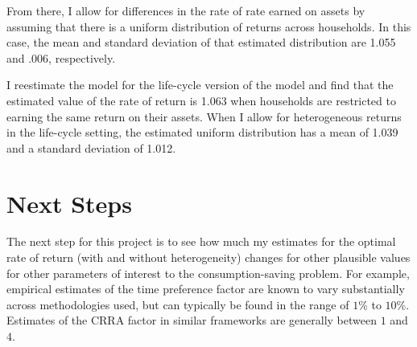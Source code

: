 \documentclass[\econtexRoot/Chp1proposal]{subfiles}
\begin{document}
\par From there, I allow for differences in the rate of rate earned on assets by assuming that there is a uniform distribution of returns across households. In this case, the mean and standard deviation of that estimated distribution are 1.055 and .006, respectively.

\par I reestimate the model for the life-cycle version of the model and find that the estimated value of the rate of return is 1.063 when households are restricted to earning the same return on their assets. When I allow for heterogeneous returns in the life-cycle setting, the estimated uniform distribution has a mean of 1.039 and a standard deviation of 1.012.

\section{Next Steps}

\par The next step for this project is to see how much my estimates for the optimal rate of return (with and without heterogeneity) changes for other plausible values for other parameters of interest to the consumption-saving problem. For example, empirical estimates of the time preference factor are known to vary substantially across methodologies used, but can typically be found in the range of $1$\% to $10$\%. Estimates of the CRRA factor in similar frameworks are generally between $1$ and $4$.



\onlyinsubfile{}

\end{document}
